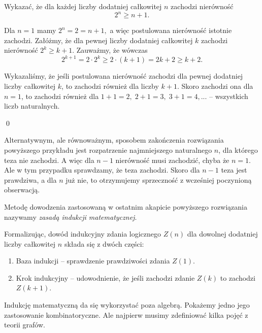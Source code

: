 


\noindent
Wykazać, że dla każdej liczby dodatniej całkowitej $n$ zachodzi nierówność
\[
	2^n \geqslant n + 1.
\]


\noindent
Dla $n = 1$ mamy $2^n = 2 = n + 1,$ a więc postulowana nierówność istotnie zachodzi.
Załóżmy, że dla pewnej liczby dodatniej całkowitej $k$ zachodzi nierówność ${2^k \geqslant k + 1}$. Zauważmy, że wówczas
\[
	2^{k + 1} = 2 \cdot 2^k \geqslant 2 \cdot (k + 1) = 2k + 2 \geqslant k + 2.
\]

\noindent
Wykazaliśmy, że jeśli postulowana nierówność zachodzi dla pewnej dodatniej liczby całkowitej $k$, to zachodzi również dla liczby $k + 1$. Skoro zachodzi ona dla $n = 1$, to zachodzi również dla $1 + 1 = 2,\; 2 + 1 = 3,\; 3 + 1 = 4, ...$ -- wszystkich liczb naturalnych.

\qed

\vspace{10px}

\noindent
Alternatywnym, ale równoważnym, sposobem zakończenia rozwiązania powyższego przykładu jest rozpatrzenie najmniejszego naturalnego $n$, dla którego teza nie zachodzi. A więc dla $n - 1$ nierówność musi zachodzić, chyba że $n = 1$. Ale w tym przypadku sprawdzamy, że teza zachodzi. Skoro dla $n - 1$ teza jest prawdziwa, a dla $n$ już nie, to otrzymujemy sprzeczność z wcześniej poczynioną obserwacją.

\vspace{10px}

\noindent
Metodę dowodzenia zastosowaną w ostatnim akapicie powyższego rozwiązania nazywamy \textit{zasadą indukcji matematycznej}.


Formalizując, dowód indukcyjny zdania logicznego $Z(n)$ dla dowolnej dodatniej liczby całkowitej $n$ składa się z dwóch części:
\begin{enumerate}
	\item Baza indukcji -- sprawdzenie prawdziwości zdania $Z(1)$.
	\item Krok indukcyjny -- udowodnienie, że jeśli zachodzi zdanie $Z(k)$ to zachodzi $Z(k + 1)$.
\end{enumerate}


\noindent
Indukcję matematyczną da się wykorzystać poza algebrą. Pokażemy jedno jego zastosowanie kombinatoryczne. Ale najpierw musimy zdefiniować kilka pojęć z teorii grafów.


